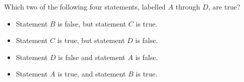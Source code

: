 Which two of the following four statements, labelled $A$ through $D$, are true?
\begin{itemize}
\item[$A$:] Statement $B$ is false, but statement $C$ is true.
\item[$B$:] Statement $C$ is true, but statement $D$ is false.
\item[$C$:] Statement $D$ is false and statement $A$ is false.
\item[$D$:] Statement $A$ is true, and statement $B$ is true.
\end{itemize}
